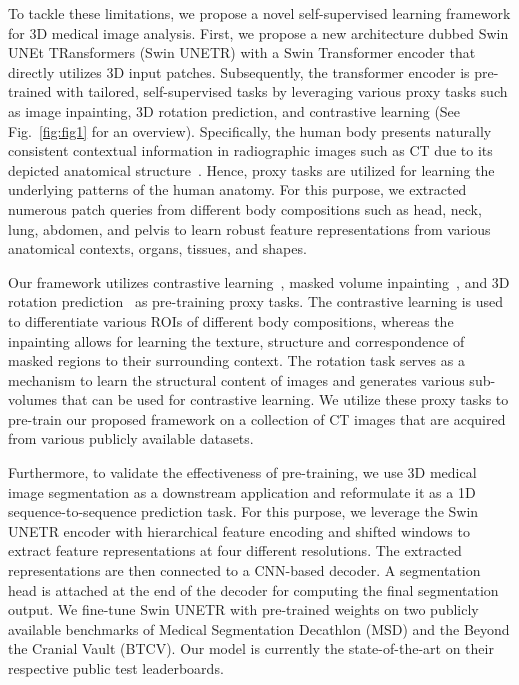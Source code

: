 \documentclass[10pt,twocolumn,letterpaper]{article}
\begin{document}
To tackle these limitations, we propose a novel self-supervised learning framework for 3D medical image analysis. First, we propose a new architecture dubbed Swin UNEt TRansformers (Swin UNETR) with a Swin Transformer encoder that directly utilizes 3D input patches. Subsequently, the transformer encoder is pre-trained with tailored, self-supervised tasks by leveraging various proxy tasks such as image inpainting, 3D rotation prediction, and contrastive learning (See Fig.~\ref{fig:fig1} for an overview). Specifically, the human body presents naturally consistent contextual information in radiographic images such as CT due to its depicted anatomical structure~\cite{yan2020self, tang2021body}. Hence, proxy tasks are utilized for learning the underlying patterns of the human anatomy. For this purpose, we extracted numerous patch queries from different body compositions such as head, neck, lung, abdomen, and pelvis to learn robust feature representations from various anatomical contexts, organs, tissues, and shapes. 

Our framework utilizes contrastive learning~\cite{oord2018representation}, masked volume inpainting~\cite{pathak2016context}, and 3D rotation prediction~\cite{gidaris2018unsupervised} as pre-training proxy tasks. The contrastive learning is used to differentiate various ROIs of different body compositions, whereas the inpainting allows for learning the texture, structure and correspondence of masked regions to their surrounding context. The rotation task serves as a mechanism to learn the structural content of images and generates various sub-volumes that can be used for contrastive learning. We utilize these proxy tasks to pre-train our proposed framework on a collection of  CT images that are acquired from various publicly available datasets.

Furthermore, to validate the effectiveness of pre-training, we use 3D medical image segmentation as a downstream application and reformulate it as a 1D sequence-to-sequence prediction task. For this purpose, we leverage the Swin UNETR encoder with hierarchical feature encoding and shifted windows to extract feature representations at four different resolutions. The extracted representations are then connected to a CNN-based decoder. A segmentation head is attached at the end of the decoder for computing the final segmentation output. We fine-tune Swin UNETR with pre-trained weights on two publicly available benchmarks of Medical Segmentation Decathlon (MSD) and the Beyond the Cranial Vault (BTCV). Our model is currently the state-of-the-art on their respective public test leaderboards.  
\end{document}
